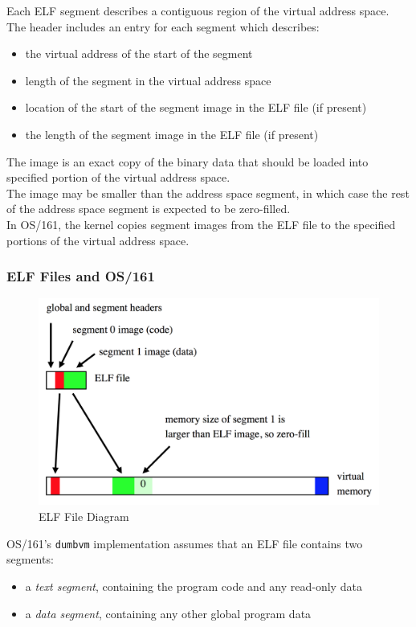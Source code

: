 \documentclass[12pt]{article}
\theoremstyle{plain}
\theoremstyle{definition}
\begin{document}
Each ELF segment describes a contiguous region of the virtual address space. \\

The header includes an entry for each segment which describes:
\begin{itemize}
  \item the virtual address of the start of the segment
  \item length of the segment in the virtual address space
  \item location of the start of the segment image in the ELF file (if present)
  \item the length of the segment image in the ELF file (if present)
\end{itemize}

The image is an exact copy of the binary data that should be loaded into specified portion of the virtual address space. \\

The image may be smaller than the address space segment, in which case the rest of the address space segment is expected to be zero-filled. \\

In OS/161, the kernel copies segment images from the ELF file to the specified portions of the virtual address space.

\subsubsection{ELF Files and OS/161}
\begin{figure}[H]
  \centering
  \includegraphics[scale=0.39]{pictures/elf_diagram.png}
  \caption{ELF File Diagram}
  \label{fig:elf}
\end{figure}
OS/161's \texttt{dumbvm} implementation assumes that an ELF file contains two segments:
\begin{itemize}
  \item a \emph{text segment}, containing the program code and any read-only data
  \item a \emph{data segment}, containing any other global program data
\end{itemize}
\end{document}
